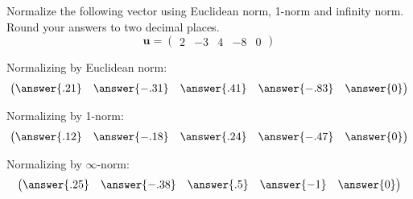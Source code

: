 \documentclass{ximera}
\author{Parisa Fatheddin}
\begin{document}
\begin{exercise}

Normalize the following vector using Euclidean norm, 1-norm and infinity norm. Round your answers to two decimal places.
\[ \textbf{u} = \begin{pmatrix} 2 & -3& 4 & -8 & 0\end{pmatrix}
\]

\begin{prompt}
Normalizing by Euclidean norm:
\[ \begin{pmatrix}
\answer{.21} & \answer{-.31} & \answer{.41} & \answer{-.83} & \answer{0}
\end{pmatrix}\]

Normalizing by 1-norm:
\[
\begin{pmatrix}
\answer{.12} & \answer{-.18} & \answer{.24} & \answer{-.47} & \answer{0}
\end{pmatrix}\]

Normalizing by $\infty$-norm:
\[ \begin{pmatrix}
\answer{.25} & \answer{-.38} & \answer{.5} & \answer{-1} & \answer{0}
\end{pmatrix}\]
\end{prompt}
























\end{exercise}
\end{document}

